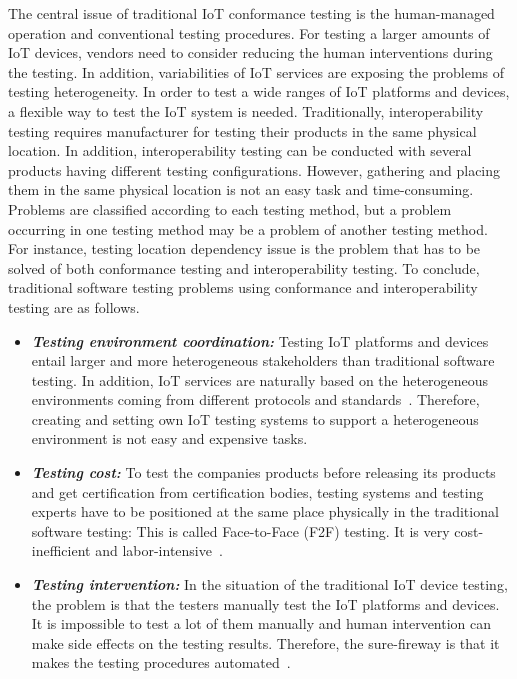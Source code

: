 The central issue of traditional IoT conformance testing is the human-managed operation and conventional testing procedures. For testing a larger amounts of IoT devices, vendors need to consider reducing the human interventions during the testing. In addition, variabilities of IoT services are exposing the problems of testing heterogeneity. In order to test a wide ranges of IoT platforms and devices, a flexible way to test the IoT system is needed. Traditionally, interoperability testing requires manufacturer for testing their products in the same physical location. In addition, interoperability testing can be conducted with several products having different testing configurations. However, gathering and placing them in the same physical location is not an easy task and time-consuming. Problems are classified according to each testing method, but a problem occurring in one testing method may be a problem of another testing method. For instance, testing location dependency issue is the problem that has to be solved of both conformance testing and interoperability testing. To conclude, traditional software testing problems using conformance and interoperability testing are as follows.

% 

\begin{itemize}
    \item \textbf{\textit{Testing environment coordination:}} Testing IoT platforms and devices entail larger and more heterogeneous stakeholders than traditional software testing. In addition, IoT services are naturally based on the heterogeneous environments coming from different protocols and standards~\cite{reetz2013test, brady2017towards}. Therefore, creating and setting own IoT testing systems to support a heterogeneous environment is not easy and expensive tasks.
 
    \item \textbf{\textit{Testing cost:}} To test the companies products before releasing its products and get certification from certification bodies, testing systems and testing experts have to be positioned at the same place physically in the traditional software testing: This is called Face-to-Face (F2F) testing. It is very cost-inefficient and labor-intensive~\cite{kim2017towards}.
   
    \item \textbf{\textit{Testing intervention:}} In the situation of the traditional IoT device testing, the problem is that the testers manually test the IoT platforms and devices. It is impossible to test a lot of them manually and human intervention can make side effects on the testing results. Therefore, the sure-fireway is that it makes the testing procedures automated~\cite{kim2018iot}.
\end{itemize}

